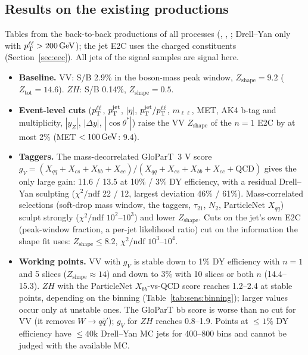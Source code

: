 \subsection{Results on the existing productions}
\label{app:sens:phaseA}

Tables from the back-to-back productions of all processes (, ,
; Drell--Yan only with $p_{\mathrm{T}}^{\ell\ell} > 200\,\mathrm{GeV}$); the jet E2C uses the charged constituents
(Section~\ref{sec:eec}). All jets of the signal samples are signal here.

\begin{itemize}
\item \textbf{Baseline.} VV: S/B 2.9\% in the boson-mass peak window, $Z_\mathrm{shape} = 9.2$ ($Z_\mathrm{tot} = 14.6$).
  $ZH$: S/B 0.14\%, $Z_\mathrm{shape} = 0.5$.
\item \textbf{Event-level cuts} ($p_{\mathrm{T}}^{\ell\ell}$, $p_{\mathrm{T}}^{\mathrm{jet}}$, $|\eta|$, $p_{\mathrm{T}}^{\mathrm{jet}}/p_{\mathrm{T}}^{\ell\ell}$, $m_{\ell\ell}$, MET, AK4 b-tag and
  multiplicity, $|y_Z|$, $|\Delta y|$, $|\cos\theta^*|$) raise the VV $Z_\mathrm{shape}$ of the $n = 1$ E2C by at most
  2\% (MET $< 100\,\mathrm{GeV}$: 9.4).
\item \textbf{Taggers.} The mass-decorrelated GloParT~3 V score
  $g_V = (X_{qq}+X_{cs}+X_{bb}+X_{cc})/(X_{qq}+X_{cs}+X_{bb}+X_{cc}+\mathrm{QCD})$ gives the only large gain:
  11.6 / 13.5 at 10\% / 3\% DY efficiency, with a residual Drell--Yan sculpting ($\chi^2/\mathrm{ndf}$ 22 / 12, largest
  deviation 46\% / 61\%). Mass-correlated selections (soft-drop mass window, the  taggers, $\tau_{21}$,
  $N_2$, ParticleNet $X_{qq}$) sculpt strongly ($\chi^2/\mathrm{ndf}$ $10^2$--$10^3$) and lower $Z_\mathrm{shape}$. Cuts
  on the jet's own E2C (peak-window fraction, a per-jet likelihood ratio) cut on the information the shape fit uses:
  $Z_\mathrm{shape} \le 8.2$, $\chi^2/\mathrm{ndf}$ $10^3$--$10^4$.
\item \textbf{Working points.} VV with $g_V$ is stable down to 1\% DY efficiency with $n = 1$ and 5 slices
  ($Z_\mathrm{shape} \approx 14$) and down to 3\% with 10 slices or both $n$ (14.4--15.3). $ZH$ with the ParticleNet
  $X_{bb}$-vs-QCD score reaches 1.2--2.4 at stable points, depending on the binning (Table~\ref{tab:sens:binning});
  larger values occur only at unstable ones. The GloParT bb
  score is worse than no cut for VV (it removes $W\to q\bar q'$); $g_V$ for $ZH$ reaches 0.8--1.9. Points at
  $\le 1\%$ DY efficiency have $\le 40$k Drell--Yan MC jets for 400--800 bins and cannot be judged with the available MC.

\end{itemize}
